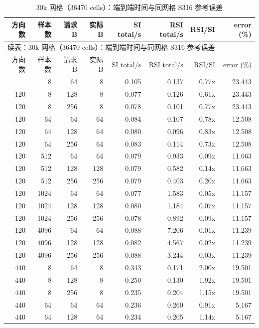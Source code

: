 {\tiny\setlength{\tabcolsep}{2.3pt}
\begin{longtable}{rrrrrrrr}
\caption{30k 网格（36470 cells）：端到端时间与同网格 S316 参考误差}\label{tab:factor-time-30k}\\
\toprule
方向数 & 样本数 & 请求 B & 实际 B & SI total/s & RSI total/s & RSI/SI & error (\%)\\
\midrule
\endfirsthead
\multicolumn{8}{l}{\small 续表：30k 网格（36470 cells）：端到端时间与同网格 S316 参考误差}\\
\toprule
方向数 & 样本数 & 请求 B & 实际 B & SI total/s & RSI total/s & RSI/SI & error (\%)\\
\midrule
\endhead
\bottomrule
\endfoot
120 & 8 & 64 & 8 & 0.105 & 0.137 & 0.77x & 23.443\\
120 & 8 & 128 & 8 & 0.077 & 0.126 & 0.61x & 23.443\\
120 & 8 & 256 & 8 & 0.078 & 0.101 & 0.77x & 23.443\\
120 & 64 & 64 & 64 & 0.084 & 0.107 & 0.78x & 12.508\\
120 & 64 & 128 & 64 & 0.080 & 0.096 & 0.83x & 12.508\\
120 & 64 & 256 & 64 & 0.083 & 0.114 & 0.73x & 12.508\\
120 & 512 & 64 & 64 & 0.079 & 0.933 & 0.09x & 11.663\\
120 & 512 & 128 & 128 & 0.079 & 0.582 & 0.14x & 11.663\\
120 & 512 & 256 & 256 & 0.079 & 0.403 & 0.20x & 11.663\\
120 & 1024 & 64 & 64 & 0.077 & 1.583 & 0.05x & 11.157\\
120 & 1024 & 128 & 128 & 0.080 & 1.184 & 0.07x & 11.157\\
120 & 1024 & 256 & 256 & 0.078 & 0.892 & 0.09x & 11.157\\
120 & 4096 & 64 & 64 & 0.088 & 7.206 & 0.01x & 11.239\\
120 & 4096 & 128 & 128 & 0.082 & 4.567 & 0.02x & 11.239\\
120 & 4096 & 256 & 256 & 0.088 & 3.244 & 0.03x & 11.239\\
440 & 8 & 64 & 8 & 0.343 & 0.171 & 2.00x & 19.501\\
440 & 8 & 128 & 8 & 0.250 & 0.130 & 1.92x & 19.501\\
440 & 8 & 256 & 8 & 0.235 & 0.204 & 1.15x & 19.501\\
440 & 64 & 64 & 64 & 0.236 & 0.260 & 0.91x & 5.167\\
440 & 64 & 128 & 64 & 0.234 & 0.205 & 1.14x & 5.167\\

\end{longtable}}

